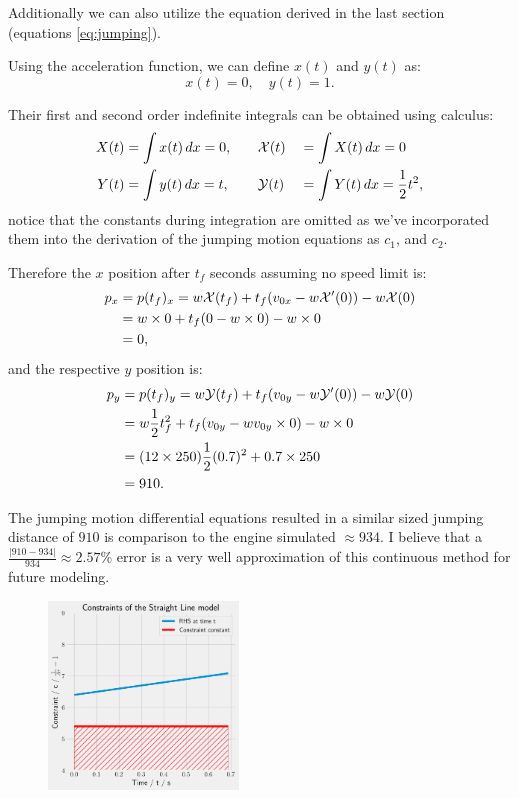 Additionally we can also utilize the equation derived in the last section (equations \ref{eq:jumping}).

Using the acceleration function, we can define $x(t)$ and $y(t)$ as:
\[
    x(t) = 0, \quad y(t) = 1.
\]

Their first and second order indefinite integrals can be obtained using calculus:
\begin{alignat*}{3}
    X(t) &= \int x(t) \, dx = 0, \quad
    &&\mathcal{X}(t) &&= \int X(t) \, dx = 0\\
    Y(t) &= \int y(t) \, dx = t, \quad
    &&\mathcal{Y}(t) &&= \int Y(t) \, dx = \frac{1}{2} t^2,
\end{alignat*}
notice that the constants during integration are omitted as we've incorporated them into the derivation of the jumping motion equations as $c_1$, and $c_2$.

Therefore the $x$ position after $t_f$ seconds assuming no speed limit is:
\begin{align*}
    p_x &= p(t_f)_x = w\mathcal{X}(t_f) + t_f(v_{0x} - w\mathcal{X}'(0)) - w\mathcal{X}(0)\\
    &= w \times 0 + t_f(0 - w \times 0) - w \times 0\\
    &= 0,
\end{align*}
and the respective $y$ position is:
\begin{align*}
    p_y &= p(t_f)_y = w\mathcal{Y}(t_f) + t_f(v_{0y} - w\mathcal{Y}'(0)) - w\mathcal{Y}(0)\\
    &= w \frac{1}{2} t_f^2 + t_f(v_{0y} - w v_{0y} \times 0) - w \times 0\\
    &= (12 \times 250) \frac{1}{2} (0.7)^2 + 0.7 \times 250\\
    &= 910.
\end{align*}


The jumping motion differential equations resulted in a similar sized jumping distance of $910$ is comparison to the engine simulated $\approx934$. I believe that a $\frac{|910-934|}{934} \approx 2.57\%$ error is a very well approximation of this continuous method for future modeling.

\begin{figure}
    \includegraphics[width=0.45\textwidth,right]{assets/straight_constraint_inequality.png}
    \caption{}
    \label{fig:straight_constraint_inequality}
\end{figure}

